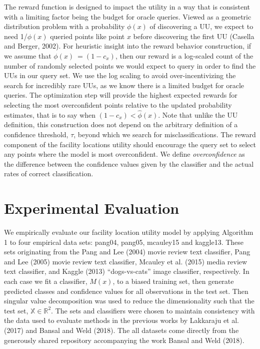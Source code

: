 \documentclass[letterpaper]{article} %
\newcommand{\km}[1]{{\color{red} #1}} %
\begin{document}
The reward function is designed to impact the utility in a way that is consistent with a limiting factor being the budget for oracle queries. Viewed as a geometric distribution problem with a probability $\phi(x)$ of discovering a UU, we expect to need 1/$\phi(x)$ queried points like point $x$ before discovering the first UU \km{(Casella and Berger, 2002)}. For heuristic insight into the reward behavior construction, if we assume that   $\phi(x) ~= (1-c_x )$, then our reward is a log-scaled count of the number of randomly selected points we would expect to query in order to find the UUs in our query set. We use the log scaling to avoid over-incentivizing the search for incredibly rare UUs, as we know there is a limited budget for oracle queries. The optimization step will provide the highest expected rewards for selecting the most overconfident points relative to the updated probability estimates, that is to say when $(1-c_x )< \hat{\phi}(x)$. Note that unlike the UU definition, this construction does not depend on the arbitrary definition of a confidence threshold, $\tau$, beyond which we search for misclassifications. The reward component of the facility locations utility should encourage the query set to select any points where the model is most overconfident. We define \textit{overconfidence} as the difference between the confidence values given by the classifier and the actual rates of correct classification. 


\section{Experimental Evaluation}

We empirically evaluate our facility location utility model by applying Algorithm 1 to four empirical data sets: pang04, pang05, mcauley15 and kaggle13. These sets originating from the \km{Pang and Lee (2004) movie review text classifier, Pang and Lee (2005) movie review text classifier, Mcauley et al. (2015) media review text classifier, and Kaggle (2013) “dogs-vs-cats” image classifier}, respectively. In each case we fit a classifier, $M(x)$, to a biased training set, then generate predicted classes and confidence values for all observations in the test set. Then singular value decomposition was used to reduce the dimensionality such that the test set, $\mathbb{X} \in \mathbb{R}^2$. The sets and classifiers were chosen to maintain consistency with the data used to evaluate methods in the previous works by Lakkaraju et al. (2017) and Bansal and Weld (2018). The all datasets come directly from the generously shared repository accompanying the work Bansal and Weld (2018). 
\end{document}
